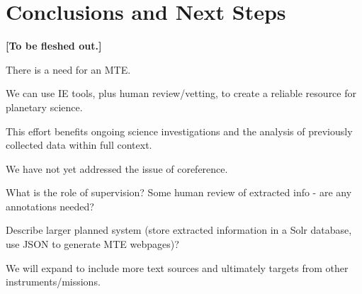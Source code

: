 \documentclass[letterpaper]{article}
\begin{document}
\section{Conclusions and Next Steps}

{\bf [To be fleshed out.]}

There is a need for an MTE.

We can use IE tools, plus human review/vetting, to create a reliable
resource for planetary science.

This effort benefits ongoing science investigations and the analysis of
previously collected data within full context.

We have not yet addressed the issue of coreference.

What is the role of supervision? Some human review of extracted info -
are any annotations needed? 

Describe larger planned system (store extracted information in a
Solr database, use JSON to generate MTE webpages)?

We will expand to include more text sources and ultimately targets
from other instruments/missions.



\end{document}
